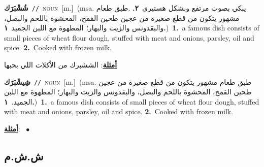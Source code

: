 \documentclass[10pt,a4paper,twoside]{article} %
\begin{document}
\begin{multicols}{2}
{\setlength\topsep{0pt}\textbf{\foreignlanguage{arabic}{شُشْبَرَك}}\ {\color{gray}\texttt{//}\color{black}}\ \textsc{noun}\ [m.]\ \color{gray}(msa. \foreignlanguage{arabic}{يبكي بصوت مرتفع وبشكل هستيري}~\foreignlanguage{arabic}{\textbf{٢.}}  .\foreignlanguage{arabic}{طبق طعام مشهور يتكون من قطع صغيرة من عجين طحين القمح، المحشوة باللحم والبصل، والبقدونس والزيت والبهار؛ المطهوة مع اللبن الجميد}~\foreignlanguage{arabic}{\textbf{١.}})\color{black}\ \textbf{1.}~a famous dish consists of small pieces of wheat flour dough, stuffed with meat and onions, parsley, oil and spice.  \textbf{2.}~Cooked with frozen milk.\  \begin{flushright}\color{gray}\foreignlanguage{arabic}{\textbf{\underline{\foreignlanguage{arabic}{أمثلة}}}: الششبرك من الأكلات اللي بحبها}\end{flushright}\color{black}} \vspace{2mm}

{\setlength\topsep{0pt}\textbf{\foreignlanguage{arabic}{شِيشْبَرَك}}\ {\color{gray}\texttt{//}\color{black}}\ \textsc{noun}\ [m.]\ \color{gray}(msa. \foreignlanguage{arabic}{طبق طعام مشهور يتكون من قطع صغيرة من عجين طحين القمح، المحشوة باللحم والبصل، والبقدونس والزيت والبهار؛ المطهوة مع اللبن الجميد.}~\foreignlanguage{arabic}{\textbf{١.}})\color{black}\ \textbf{1.}~a famous dish consists of small pieces of wheat flour dough, stuffed with meat and onions, parsley, oil and spice.  \textbf{2.}~Cooked with frozen milk.\  \begin{flushright}\color{gray}\foreignlanguage{arabic}{\textbf{\underline{\foreignlanguage{arabic}{أمثلة}}}: \ $\bullet$\ \  }\end{flushright}\color{black}} \vspace{2mm}

\vspace{-3mm}
\subsection*{\color{blue}\foreignlanguage{arabic}{ش.ش.م}\color{blue}{}} 


\end{multicols}
\end{document}
